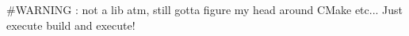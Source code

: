 \#\+WARNING \+: not a lib atm, still gotta figure my head around CMake etc... Just execute build and execute! 